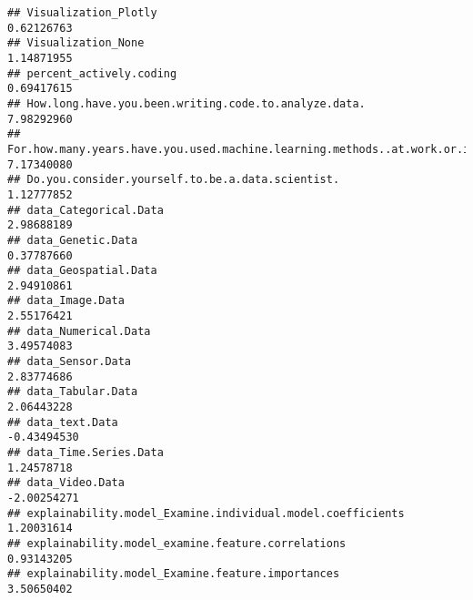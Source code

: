 \documentclass[
]{article}
\begin{document}
\begin{verbatim}
## Visualization_Plotly                                                                                                         0.62126763
## Visualization_None                                                                                                           1.14871955
## percent_actively.coding                                                                                                      0.69417615
## How.long.have.you.been.writing.code.to.analyze.data.                                                                         7.98292960
## For.how.many.years.have.you.used.machine.learning.methods..at.work.or.in.school..                                            7.17340080
## Do.you.consider.yourself.to.be.a.data.scientist.                                                                             1.12777852
## data_Categorical.Data                                                                                                        2.98688189
## data_Genetic.Data                                                                                                            0.37787660
## data_Geospatial.Data                                                                                                         2.94910861
## data_Image.Data                                                                                                              2.55176421
## data_Numerical.Data                                                                                                          3.49574083
## data_Sensor.Data                                                                                                             2.83774686
## data_Tabular.Data                                                                                                            2.06443228
## data_text.Data                                                                                                              -0.43494530
## data_Time.Series.Data                                                                                                        1.24578718
## data_Video.Data                                                                                                             -2.00254271
## explainability.model_Examine.individual.model.coefficients                                                                   1.20031614
## explainability.model_examine.feature.correlations                                                                            0.93143205
## explainability.model_Examine.feature.importances                                                                             3.50650402

\end{verbatim}
\end{document}
